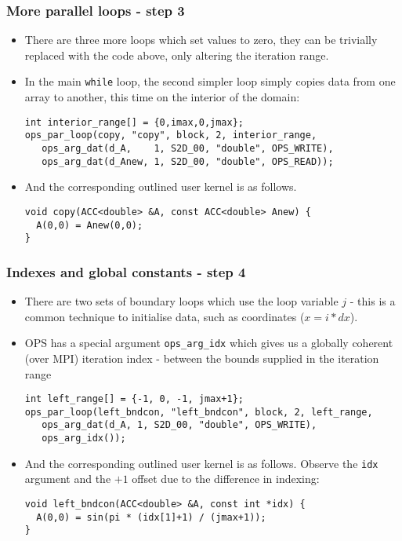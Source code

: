 \documentclass{beamer}
\begin{document}
\begin{frame}[fragile]
\frametitle{More parallel loops - step 3}
\begin{itemize}
\item There are three more loops which set values to zero, they can be trivially replaced with the code above, only altering the iteration range.
\item In the main \texttt{while} loop, the second simpler loop simply copies data from one array to another, this time on the interior of the domain:
\begin{lstlisting}
int interior_range[] = {0,imax,0,jmax};
ops_par_loop(copy, "copy", block, 2, interior_range,
   ops_arg_dat(d_A,    1, S2D_00, "double", OPS_WRITE),
   ops_arg_dat(d_Anew, 1, S2D_00, "double", OPS_READ));
\end{lstlisting}  
  \item And the corresponding outlined user kernel is as follows. 
\begin{lstlisting}
void copy(ACC<double> &A, const ACC<double> Anew) {
  A(0,0) = Anew(0,0);
}
\end{lstlisting}  
\end{itemize}
\end{frame}

\begin{frame}[fragile]
\frametitle{Indexes and global constants - step 4}
\begin{itemize}
\item There are two sets of boundary loops which use the loop variable $j$ - this is a common technique to initialise data, such as coordinates ($x=i*dx$).
\item OPS has a special argument \texttt{ops\_arg\_idx} which gives us a globally coherent (over MPI) iteration index - between the bounds supplied in the iteration range
\begin{lstlisting}
int left_range[] = {-1, 0, -1, jmax+1};
ops_par_loop(left_bndcon, "left_bndcon", block, 2, left_range,
   ops_arg_dat(d_A, 1, S2D_00, "double", OPS_WRITE),
   ops_arg_idx());
\end{lstlisting}  
  \item And the corresponding outlined user kernel is as follows. Observe the \texttt{idx} argument and the $+1$ offset due to the difference in indexing:
\begin{lstlisting}
void left_bndcon(ACC<double> &A, const int *idx) {
  A(0,0) = sin(pi * (idx[1]+1) / (jmax+1));
}
\end{lstlisting}  
\end{itemize}
\end{frame}
\end{document}
